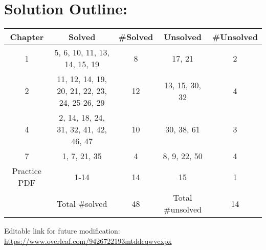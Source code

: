 \maketitle
\section*{Solution Outline:}
\begin{table}[h!]
    \centering
    \begin{tabular}{|c|c|c|c|c|}
        \hline
        Chapter      & Solved                                        & \#Solved & Unsolved         & \#Unsolved \\ \hline
        1            & 5, 6, 10, 11, 13, 14, 15, 19                  & 8        & 17, 21           & 2          \\ \hline
        2            & 11, 12, 14, 19, 20, 21, 22, 23, 24, 25 26, 29 & 12       & 13, 15, 30, 32   & 4          \\ \hline
        4            & 2, 14, 18, 24, 31, 32, 41, 42, 46, 47         & 10       & 30, 38, 61       & 3          \\ \hline
        7            & 1, 7, 21, 35                                  & 4        & 8, 9, 22, 50     & 4          \\ \hline
        Practice PDF & 1-14                                          & 14       & 15               & 1          \\ \hline \hline
                     & Total \#solved                                & 48       & Total \#unsolved & 14         \\ \hline
    \end{tabular}
\end{table}

Editable link for future modification: \url{https://www.overleaf.com/9426722193mtddcqwvcxpx}
\clearpage